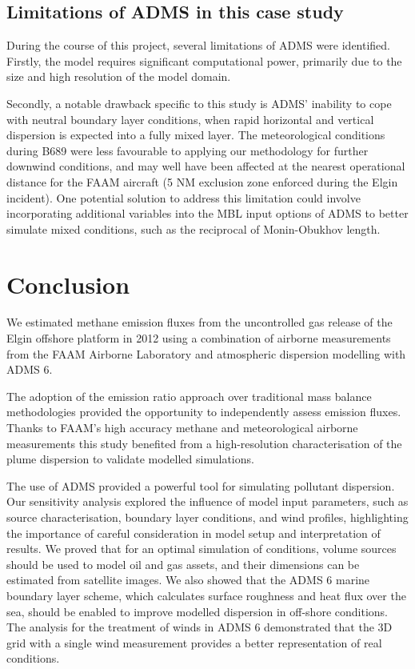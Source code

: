 \documentclass[12pt]{article}
\begin{document}
\subsection{Limitations of ADMS in this case study}
During the course of this project, several limitations of ADMS were identified. Firstly, the model requires significant computational power, primarily due to the size and high resolution of the model domain. 

Secondly, a notable drawback specific to this study is ADMS’ inability to cope with neutral boundary layer conditions, when rapid horizontal and vertical dispersion is expected into a fully mixed layer. The meteorological conditions during B689 were less favourable to applying our methodology for further downwind conditions, and may well have been affected at the nearest operational distance for the FAAM aircraft (5 NM exclusion zone enforced during the Elgin incident).  One potential solution to address this limitation could involve incorporating additional variables into the MBL input options of ADMS to better simulate mixed conditions, such as the reciprocal of Monin-Obukhov length.

\section{Conclusion}

We estimated methane emission fluxes from the uncontrolled gas release of the Elgin offshore platform in 2012 using a combination of airborne measurements from the FAAM Airborne Laboratory and atmospheric dispersion modelling with ADMS 6.

The adoption of the emission ratio approach over traditional mass balance methodologies provided the opportunity to independently assess emission fluxes. Thanks to FAAM’s high accuracy methane and meteorological airborne measurements this study benefited from a high-resolution characterisation of the plume dispersion to validate modelled simulations.

The use of ADMS provided a powerful tool for simulating pollutant dispersion. Our sensitivity analysis explored the influence of model input parameters, such as source characterisation, boundary layer conditions, and wind profiles, highlighting the importance of careful consideration in model setup and interpretation of results. We proved that for an optimal simulation of conditions, volume sources should be used to model oil and gas assets, and their dimensions can be estimated from satellite images. We also showed that the ADMS 6 marine boundary layer scheme, which calculates surface roughness and heat flux over the sea, should be enabled to improve modelled dispersion in off-shore conditions. The analysis for the treatment of winds in ADMS 6 demonstrated that the 3D grid with a single wind measurement provides a better representation of real conditions. 
\end{document}
